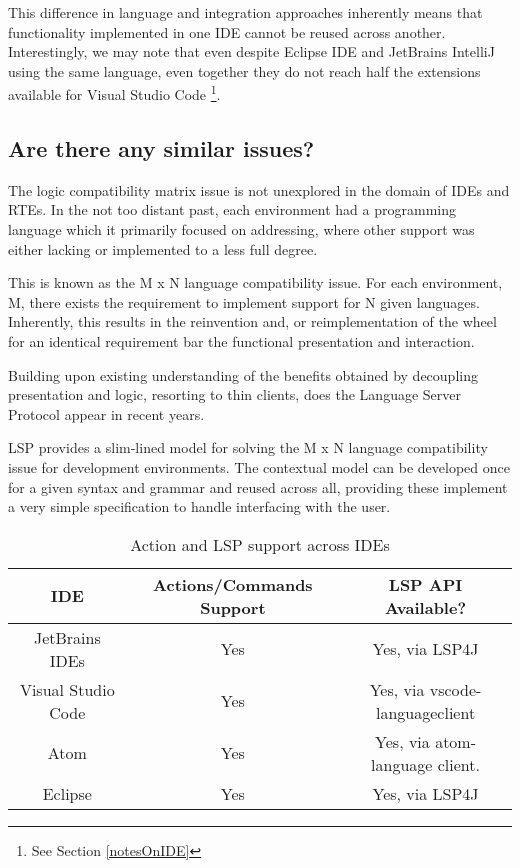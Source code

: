 This difference in language and integration approaches inherently means that functionality implemented in one IDE cannot be reused across another. Interestingly, we may note that even despite Eclipse IDE and JetBrains IntelliJ using the same language, even together they do not reach half the extensions available for Visual Studio Code \footnote{See Section \ref{notesOnIDE} }.

\subsection{Are there any similar issues?}

The logic compatibility matrix issue is not unexplored in the domain of IDEs and RTEs. In the not too distant past, each environment had a programming language which it primarily focused on addressing, where other support was either lacking or implemented to a less full degree. 

This is known as the M x N language compatibility issue. For each environment, M, there exists the requirement to implement support for N given languages. Inherently, this results in the reinvention and, or reimplementation of the wheel for an identical requirement bar the functional presentation and interaction.

Building upon existing understanding of the benefits obtained by decoupling presentation and logic, resorting to thin clients, does the Language Server Protocol \parencite{lspGitHubSiteMSFT} appear in recent years.

LSP provides a slim-lined model for solving the M x N language compatibility issue for development environments. The contextual model can be developed once for a given syntax and grammar and reused across all, providing these implement a very simple specification to handle interfacing with the user.

\begin{table}[h!]
	\centering
	\begin{tabular}{ | c | c | c |}
		\hline
		IDE & Actions/Commands Support & LSP API Available?\\
		\hline
		\hline
		JetBrains IDEs & Yes & Yes, via LSP4J\\ 
		Visual Studio Code & Yes & Yes, via vscode-languageclient \\
		Atom & Yes & Yes, via atom-language client.\\
		Eclipse & Yes & Yes, via LSP4J\\
		\hline
	\end{tabular}
	\caption{Action and LSP support across IDEs}
	\label{table:1}
\end{table}


